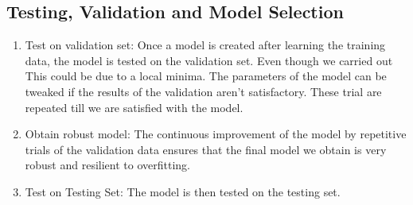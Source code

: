 \documentclass[letterpaper,12pt, onecolumn]{article}%
\begin{document}
\subsection{Testing, Validation and Model Selection}
\begin{enumerate}
\item Test on validation set: Once a model is created after learning the training data, the model is tested on the validation set. Even though we carried out This could be due to a local minima. The parameters of the model can be tweaked if the results of the validation aren’t satisfactory. These trial are repeated till we are satisfied with the model.

\item Obtain robust model: The continuous improvement of the model by repetitive trials of the validation data ensures that the final model we obtain is very robust and resilient to overfitting.

\item Test on Testing Set: The model is then tested on the testing set.


\end{enumerate}
\end{document}
